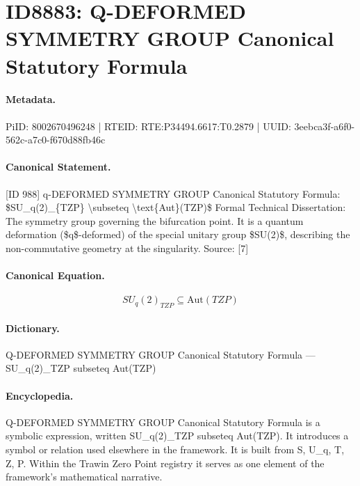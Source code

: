\section*{ID8883: Q-DEFORMED SYMMETRY GROUP Canonical Statutory Formula}
\paragraph{Metadata.}
PiID: 8002670496248 | RTEID: RTE:P34494.6617:T0.2879 | UUID: 3eebca3f-a6f0-562c-a7c0-f670d88fb46c

\paragraph{Canonical Statement.}
[ID 988] q-DEFORMED SYMMETRY GROUP Canonical Statutory Formula: \$SU\_q(2)\_\{TZP\} \textbackslash{}subseteq \textbackslash{}text\{Aut\}(TZP)\$ Formal Technical Dissertation: The symmetry group governing the bifurcation point. It is a quantum deformation (\$q\$-deformed) of the special unitary group \$SU(2)\$, describing the non-commutative geometry at the singularity. Source: [7]

\paragraph{Canonical Equation.}
\[
SU_q(2)_{TZP} \subseteq \text{Aut}(TZP)
\]

\paragraph{Dictionary.}
Q-DEFORMED SYMMETRY GROUP Canonical Statutory Formula — SU\_q(2)\_TZP subseteq Aut(TZP)

\paragraph{Encyclopedia.}
Q-DEFORMED SYMMETRY GROUP Canonical Statutory Formula is a symbolic expression, written SU\_q(2)\_TZP subseteq Aut(TZP). It introduces a symbol or relation used elsewhere in the framework. It is built from S, U\_q, T, Z, P. Within the Trawin Zero Point registry it serves as one element of the framework's mathematical narrative.
